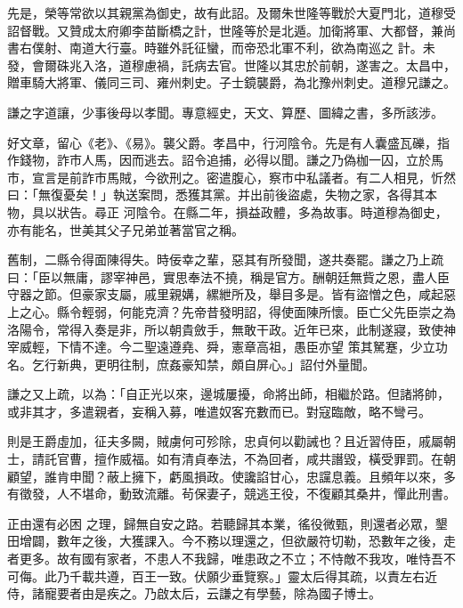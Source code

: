 \begin{pinyinscope}
 先是，榮等常欲以其親黨為御史，故有此詔。及爾朱世隆等戰於大夏門北，道穆受詔督戰。又贊成太府卿李苗斷橋之計，世隆等於是北遁。加衛將軍、大都督，兼尚書右僕射、南道大行臺。時雖外託征蠻，而帝恐北軍不利，欲為南巡之
 計。未發，會爾硃兆入洛，道穆慮禍，託病去官。世隆以其忠於前朝，遂害之。太昌中，贈車騎大將軍、儀同三司、雍州刺史。子士鏡襲爵，為北豫州刺史。道穆兄謙之。



 謙之字道讓，少事後母以孝聞。專意經史，天文、算歷、圖緯之書，多所該涉。



 好文章，留心《老》、《易》。襲父爵。孝昌中，行河陰令。先是有人囊盛瓦礫，指作錢物，詐市人馬，因而逃去。詔令追捕，必得以聞。謙之乃偽枷一囚，立於馬市，宣言是前詐市馬賊，今欲刑之。密遣腹心，察市中私議者。有二人相見，忻然曰：「無復憂矣！」執送案問，悉獲其黨。并出前後盜處，失物之家，各得其本物，具以狀告。尋正
 河陰令。在縣二年，損益政體，多為故事。時道穆為御史，亦有能名，世美其父子兄弟並著當官之稱。



 舊制，二縣令得面陳得失。時佞幸之輩，惡其有所發聞，遂共奏罷。謙之乃上疏曰：「臣以無庸，謬宰神邑，實思奉法不撓，稱是官方。酬朝廷無貲之恩，盡人臣守器之節。但豪家支屬，戚里親媾，縲紲所及，舉目多是。皆有盜憎之色，咸起惡上之心。縣令輕弱，何能克濟？先帝昔發明詔，得使面陳所懷。臣亡父先臣崇之為洛陽令，常得入奏是非，所以朝貴斂手，無敢干政。近年已來，此制遂寢，致使神宰威輕，下情不達。今二聖遠遵堯、舜，憲章高祖，愚臣亦望
 策其駑蹇，少立功名。乞行新典，更明往制，庶姦豪知禁，頗自屏心。」詔付外量聞。



 謙之又上疏，以為：「自正光以來，邊城屢擾，命將出師，相繼於路。但諸將帥，或非其才，多遣親者，妄稱入募，唯遣奴客充數而已。對寇臨敵，略不彎弓。



 則是王爵虛加，征夫多闕，賊虜何可殄除，忠貞何以勸誡也？且近習侍臣，戚屬朝士，請託官曹，擅作威福。如有清貞奉法，不為回者，咸共譖毀，橫受罪罰。在朝顧望，誰肯申聞？蔽上擁下，虧風損政。使讒諂甘心，忠讜息義。且頻年以來，多有徵發，人不堪命，動致流離。茍保妻子，競逃王役，不復顧其桑井，憚此刑書。



 正由還有必困
 之理，歸無自安之路。若聽歸其本業，徭役微甄，則還者必眾，墾田增闢，數年之後，大獲課入。今不務以理還之，但欲嚴符切勒，恐數年之後，走者更多。故有國有家者，不患人不我歸，唯患政之不立；不恃敵不我攻，唯恃吾不可侮。此乃千載共遵，百王一致。伏願少垂覽察。」靈太后得其疏，以責左右近侍，諸寵要者由是疾之。乃啟太后，云謙之有學藝，除為國子博士。




\end{pinyinscope}
